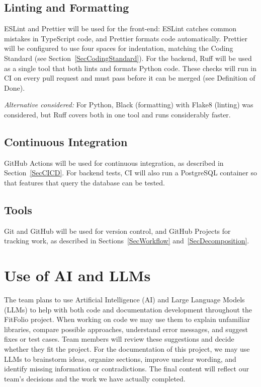 \documentclass{article}
\begin{document}
\subsection{Linting and Formatting} \label{sec:linting}
ESLint and Prettier will be used for the front-end: ESLint catches common mistakes in TypeScript code, and Prettier formats code automatically. Prettier will be configured to use four spaces for
indentation, matching the Coding Standard (see Section~\ref{SecCodingStandard}). For the backend, Ruff will be used as a single tool that
both lints and formats Python code. These checks will run in CI on every pull request and must pass before it can be merged (see Definition of Done).

\textit{Alternative considered:} For Python, Black (formatting) with Flake8 (linting) was considered, but Ruff covers both in one tool and runs considerably faster.

\subsection{Continuous Integration}
GitHub Actions will be used for continuous integration, as described in Section~\ref{SecCICD}. For backend tests, CI will also run a PostgreSQL container so that features that query the database can be tested.

\subsection{Tools}
Git and GitHub will be used for version control, and GitHub Projects for tracking work, as described in Sections~\ref{SecWorkflow} and~\ref{SecDecomposition}.

\section{Use of AI and LLMs}

The team plans to use Artificial Intelligence (AI) and Large Language Models (LLMs) to help with both code and documentation development throughout the FitFolio project. When working on code we may use them to explain unfamiliar libraries, compare possible approaches, understand error messages, and suggest fixes or test cases. Team members will review these suggestions and decide whether they fit the project. For the documentation of this project, we may use LLMs to brainstorm ideas, organize sections, improve unclear wording, and identify missing information or contradictions. The final content will reflect our team's decisions and the work we have actually completed.
\end{document}
